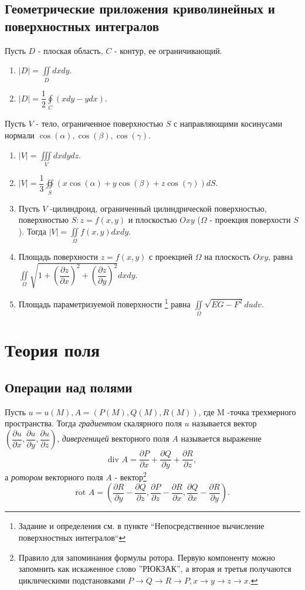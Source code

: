 \documentclass[a4paper,12pt]{scrartcl}
\begin{document}
\subsection{Геометрические приложения криволинейных и поверхностных интегралов}
Пусть $D$ - плоская область, $C$ - контур, ее ограничивающий.
\begin{enumerate}
\item $|D| = \iint\limits_Ddxdy$.
\item $|D| = \dfrac{1}{2}\oint\limits_C(xdy - ydx)$.
\end{enumerate}
Пусть $V$ - тело, ограниченное поверхностью $S$ с направляющими косинусами нормали $\cos(\alpha),\cos(\beta),\cos(\gamma)$.
\begin{enumerate}
\item  $|V| = \iiint\limits_Vdxdydz.$
\item $|V| = \dfrac{1}{3}\oiint\limits_S(x\cos(\alpha)+y\cos(\beta)+z\cos(\gamma))dS.$
\item Пусть $V$ -цилиндроид, ограниченный цилиндрической поверхностью, поверхностью $S:z = f(x,y)$ и плоскостью $Oxy$ ($\Omega$ - проекция поверхости $S$). Тогда $|V| = \iint\limits_\Omega f(x,y)dxdy$.
\item Площадь поверхности $z = f(x,y)$ с проекцией $\Omega$ на плоскость $Oxy$, равна $\iint\limits_\Omega \sqrt{1 + \left(\dfrac{\partial z}{\partial x}\right)^2 + \left(\dfrac{\partial z}{\partial y}\right)^2}dxdy$.
\item Площадь параметризуемой поверхности \footnote{Задание и определения см. в пункте ``Непосредственное вычисление поверхностных интегралов``} равна $\iint\limits_\Omega \sqrt{EG-F^2}dudv$.
\end{enumerate}
\section{Теория поля}
\subsection{Операции над полями}
Пусть $u = u(M), A = (P(M),Q(M),R(M))$, где M -точка трехмерного пространства. Тогда \emph{градиентом} скалярного поля $u$ называется вектор $\left(\dfrac{\partial u}{\partial x},\dfrac{\partial u}{\partial y},\dfrac{\partial u}{\partial z}\right)$, \emph{дивергеницей} векторного поля $A$ называется выражение $$ \text{div }A = \dfrac{\partial P}{\partial x} + \dfrac{\partial Q}{\partial y}+\dfrac{\partial R}{\partial z},$$ а \emph{ротором} векторного поля $A$ - вектор\footnote{Правило для запоминания формулы ротора. Первую компоненту можно запомнить как искаженное слово ''РЮКЗАК'', а вторая и третья получаются циклическими подстановками $P \to Q \to R \to P, x\to y\to z \to x$.} 
$$\text{rot }A = \left( \dfrac{\partial R}{\partial y} - \dfrac{\partial Q}{\partial z},\dfrac{\partial P}{\partial z} - \dfrac{\partial R}{\partial x}, \dfrac{\partial Q}{\partial x} - \dfrac{\partial R}{\partial y}\right).$$ 
\end{document}
